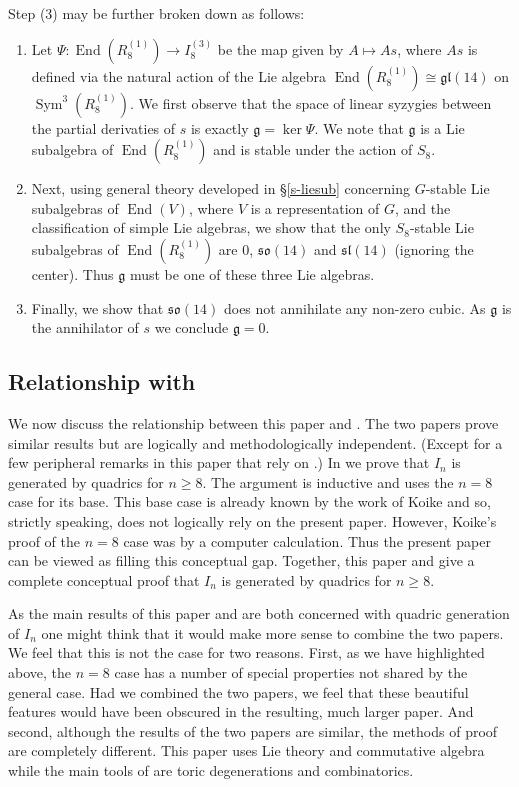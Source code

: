 \documentclass{amsart}
\theoremstyle{definition}
\theoremstyle{remark}
\DeclareMathOperator{\Sym}{Sym}
\DeclareMathOperator{\End}{End}
\let\mf\mathfrak
\begin{document}
Step (3) may be further broken down as follows:
\begin{enumerate}
\item[(3a)] Let $\Psi:\End(R_8^{(1)}) \to I_8^{(3)}$ be the map given by $A
\mapsto A s$, where $As$ is defined via the natural action of the Lie algebra
$\End(R_8^{(1)}) \cong \mf{gl}(14)$ on $\Sym^3(R_8^{(1)})$.  We first observe that
the space of linear syzygies between the partial derivaties of $s$ is exactly
$\mf{g}=\ker{\Psi}$.  We note that $\mf{g}$ is a Lie subalgebra of
$\End(R_8^{(1)})$ and is stable under the action of $S_8$.
\item[(3b)] Next, using general theory developed in \S \ref{s-liesub}
concerning $G$-stable Lie subalgebras of $\End(V)$, where $V$ is a
representation of $G$, and the classification of simple Lie algebras, we show
that the only $S_8$-stable Lie subalgebras of $\End(R_8^{(1)})$ are 0,
$\mf{so}(14)$ and $\mf{sl}(14)$ (ignoring the center).  Thus $\mf{g}$ must be
one of these three Lie algebras.
\item[(3c)] Finally, we show that $\mf{so}(14)$ does not annihilate any
non-zero cubic.  As $\mf{g}$ is the annihilator of $s$ we conclude $\mf{g}=0$.
\end{enumerate}


\subsection{Relationship with \cite{HMSV}}

We now discuss the relationship between this paper and \cite{HMSV}.  The two
papers prove similar results but are logically and methodologically independent.
(Except for a few peripheral remarks in this paper that rely on \cite{HMSV}.)
In \cite{HMSV} we prove that $I_n$ is generated by quadrics for $n \ge 8$.  The
argument is inductive and uses the $n=8$ case for its base.  This base case is
already known by the work of Koike and so, strictly speaking, \cite{HMSV} does not
logically rely on the present paper.  However, Koike's proof of the $n=8$ case was
by a computer calculation.  Thus the present paper can be viewed as filling this
conceptual gap.  Together, this paper and \cite{HMSV} give a complete conceptual
proof that $I_n$ is generated by quadrics for $n \ge 8$.

As the main results of this paper and \cite{HMSV} are both concerned with
quadric generation of $I_n$ one might think that it would make more sense to
combine the two papers.  We feel that this is not the case for two reasons.
First, as we have highlighted above, the $n=8$ case has a number of special
properties not shared by the general case.  Had we combined the two papers, we
feel that these beautiful features would have been obscured in the resulting, much
larger paper.  And second, although the results of the two papers are similar,
the methods of proof are completely different.  This paper uses Lie theory and
commutative algebra while the main tools of \cite{HMSV} are toric degenerations
and combinatorics.
\end{document}
